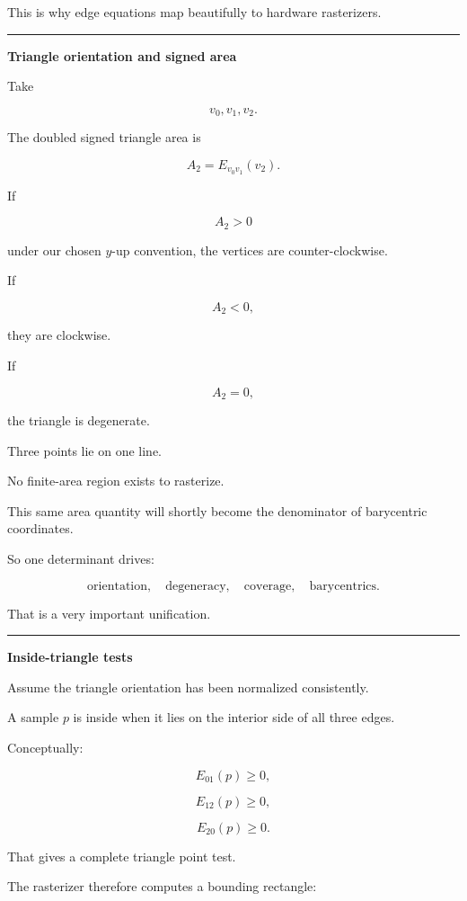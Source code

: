 This is why edge equations map beautifully to hardware rasterizers.

\begin{center}\rule{0.5\linewidth}{0.5pt}\end{center}

\textbf{Triangle orientation and signed area}

Take

\[
v_0,v_1,v_2.
\]

The doubled signed triangle area is

\[
\boxed{
A_2=E_{v_0v_1}(v_2)
}.
\]

If

\[
A_2>0
\]

under our chosen \(y\)-up convention, the vertices are counter-clockwise.

If

\[
A_2<0,
\]

they are clockwise.

If

\[
A_2=0,
\]

the triangle is degenerate.

Three points lie on one line.

No finite-area region exists to rasterize.

This same area quantity will shortly become the denominator of barycentric coordinates.

So one determinant drives:

\[
\text{orientation},
\quad
\text{degeneracy},
\quad
\text{coverage},
\quad
\text{barycentrics}.
\]

That is a very important unification.

\begin{center}\rule{0.5\linewidth}{0.5pt}\end{center}

\textbf{Inside-triangle tests}

Assume the triangle orientation has been normalized consistently.

A sample \(p\) is inside when it lies on the interior side of all three edges.

Conceptually:

\[
E_{01}(p)\ge0,
\]

\[
E_{12}(p)\ge0,
\]

\[
E_{20}(p)\ge0.
\]

That gives a complete triangle point test.

The rasterizer therefore computes a bounding rectangle:

